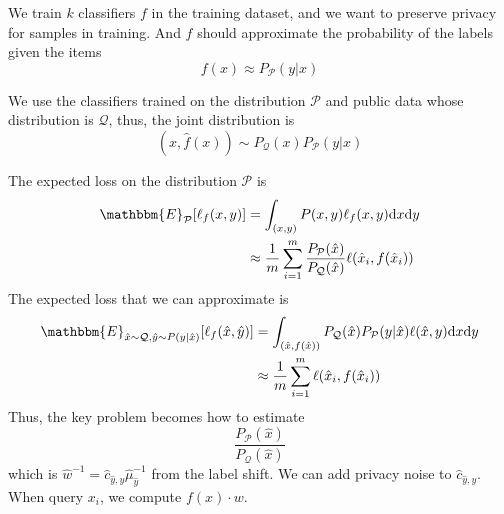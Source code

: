 \documentclass{article}
\theoremstyle{definition}
\begin{document}
We train $k$ classifiers $f$ in the training dataset, and we want to preserve privacy for samples in training. And $f$ should approximate the probability of the labels given the items
\[
f(x)\approx P_\mathcal{P}(y|x)
\]

We use the classifiers trained on the distribution $\mathcal{P}$ and public data whose distribution is $\mathcal{Q}$, thus, the joint distribution is
\[
(x,\hat{f}(x))\sim P_\mathcal{Q}(x)P_\mathcal{P}(y|x)
\]

The expected loss on the distribution $\mathcal{P}$ is
\begin{align*}
\mathbbm{E}_{\mathcal{P}}[\ell_f(x,y)]&=\int_{(x,y)}P(x,y)\ell_f(x,y){\rm d}x{\rm d}y\\
&\approx \frac{1}{m}\sum_{i=1}^m \frac{P_\mathcal{P}(\hat{x})}{P_\mathcal{Q}(\hat{x})}\ell(\hat{x}_i,f(\hat{x}_i))
\end{align*}
The expected loss that we can approximate is
\begin{align*}
\mathbbm{E}_{\hat{x}\sim \mathcal{Q},\hat{y}\sim P(y|\hat{x})}[\ell_f(\hat{x},\hat{y})]&=\int_{(\hat{x},f(\hat{x}))}P_\mathcal{Q}(\hat{x})P_\mathcal{P}(y|\hat{x})\ell(\hat{x},y){\rm d}x{\rm d}y\\
&\approx \frac{1}{m}\sum_{i=1}^{m}\ell(\hat{x}_i,f(\hat{x}_i))
\end{align*}
Thus, the key problem becomes how to estimate
\[
\frac{P_\mathcal{P}(\hat{x})}{P_\mathcal{Q}(\hat{x})}
\]
which is $\hat{w}^{-1}=\hat{c}_{\hat{y},y}\hat{\mu}^{-1}_{\hat{y}}$ from the label shift. We can add privacy noise to $\hat{c}_{\hat{y},y}$. When query $x_i$, we compute $f(x)\cdot w$.
\end{document}
